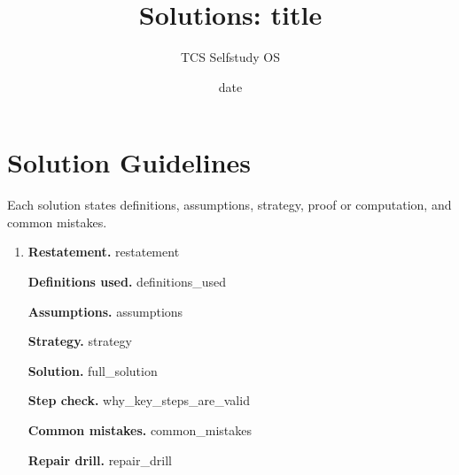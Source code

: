 \documentclass[11pt]{article}
\title{Solutions: {{title}}}
\author{TCS Selfstudy OS}
\date{{{date}}}
\begin{document}
\maketitle

\section*{Solution Guidelines}

Each solution states definitions, assumptions, strategy, proof or computation, and common mistakes.

\begin{enumerate}[label=\textbf{Solution \arabic*.}]
  \item

  \textbf{Restatement.} {{restatement}}

  \textbf{Definitions used.} {{definitions_used}}

  \textbf{Assumptions.} {{assumptions}}

  \textbf{Strategy.} {{strategy}}

  \textbf{Solution.} {{full_solution}}

  \textbf{Step check.} {{why_key_steps_are_valid}}

  \textbf{Common mistakes.} {{common_mistakes}}

  \textbf{Repair drill.} {{repair_drill}}
\end{enumerate}
\end{document}
